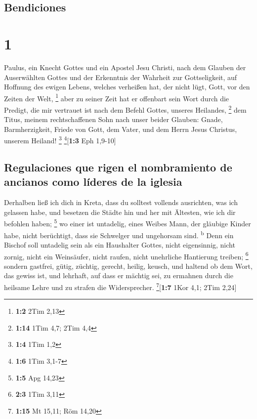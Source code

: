 \hypertarget{bendiciones}{%
\subsection{Bendiciones}\label{bendiciones}}

\hypertarget{section}{%
\section{1}\label{section}}

 Paulus, ein Knecht Gottes und ein Apostel Jesu Christi,
nach dem Glauben der Auserwählten Gottes und der Erkenntnis der Wahrheit
zur Gottseligkeit,  auf Hoffnung des ewigen Lebens,
welches verheißen hat, der nicht lügt, Gott, vor den Zeiten der Welt,
\footnote{\textbf{1:2} 2Tim 2,13}  aber zu seiner Zeit hat
er offenbart sein Wort durch die Predigt, die mir vertrauet ist nach dem
Befehl Gottes, unseres Heilandes, \footnote{\textbf{1:14} 1Tim 4,7; 2Tim
  4,4}  dem Titus, meinem rechtschaffenen Sohn nach unser
beider Glauben: Gnade, Barmherzigkeit, Friede von Gott, dem Vater, und
dem Herrn Jesus Christus, unserem Heiland! \footnote{\textbf{1:4} 1Tim
  1,2} \footnote{\textbf{1:6} 1Tim 3,1-7}{[}\textbf{1:3} Eph 1,9-10{]}

\hypertarget{regulaciones-que-rigen-el-nombramiento-de-ancianos-como-luxedderes-de-la-iglesia}{%
\subsection{Regulaciones que rigen el nombramiento de ancianos como
líderes de la
iglesia}\label{regulaciones-que-rigen-el-nombramiento-de-ancianos-como-luxedderes-de-la-iglesia}}

 Derhalben ließ ich dich in Kreta, dass du solltest
vollends ausrichten, was ich gelassen habe, und besetzen die Städte hin
und her mit Ältesten, wie ich dir befohlen haben; \footnote{\textbf{1:5}
  Apg 14,23}  wo einer ist untadelig, eines Weibes Mann,
der gläubige Kinder habe, nicht berüchtigt, dass sie Schwelger und
ungehorsam sind. \textsuperscript{b}  Denn ein Bischof
soll untadelig sein als ein Haushalter Gottes, nicht eigensinnig, nicht
zornig, nicht ein Weinsäufer, nicht raufen, nicht unehrliche Hantierung
treiben; \footnote{\textbf{2:3} 1Tim 3,11}  sondern
gastfrei, gütig, züchtig, gerecht, heilig, keusch,  und
haltend ob dem Wort, das gewiss ist, und lehrhaft, auf dass er mächtig
sei, zu ermahnen durch die heilsame Lehre und zu strafen die
Widersprecher. \footnote{\textbf{1:15} Mt 15,11; Röm 14,20}{[}\textbf{1:7}
1Kor 4,1; 2Tim 2,24{]}

